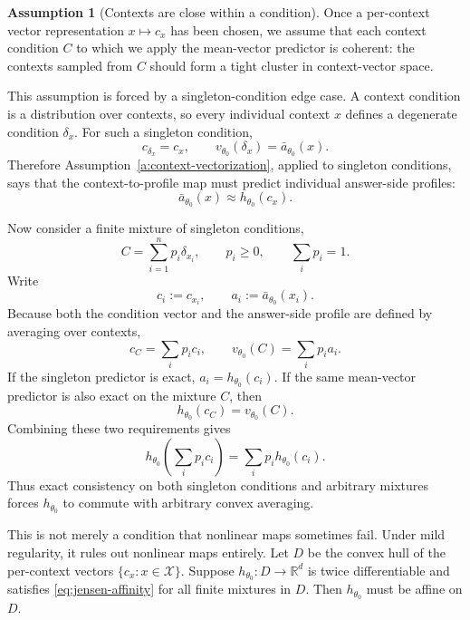 \documentclass[11pt]{article}
\theoremstyle{definition}
\theoremstyle{definition}
\theoremstyle{assumptionstyle}
\newtheorem{assumption}{Assumption}[section]
\begin{document}
\begin{assumption}[Contexts are close within a condition]
\label{a:context-vector-coherence}
Once a per-context vector representation \(x\mapsto c_x\) has been chosen, we
assume that each context condition \(C\) to which we apply the mean-vector
predictor is coherent: the contexts sampled from \(C\) should form a tight
cluster in context-vector space.

This assumption is forced by a singleton-condition edge case. A context condition
is a distribution over contexts, so every individual context \(x\) defines a
degenerate condition \(\delta_x\). For such a singleton condition,
\[
c_{\delta_x}=c_x,
\qquad
v_{\theta_0}(\delta_x)=\bar a_{\theta_0}(x).
\]
Therefore Assumption~\ref{a:context-vectorization}, applied to singleton
conditions, says that the context-to-profile map must predict individual
answer-side profiles:
\[
\bar a_{\theta_0}(x)\approx h_{\theta_0}(c_x).
\]

Now consider a finite mixture of singleton conditions,
\[
C=\sum_{i=1}^n p_i\delta_{x_i},
\qquad
p_i\ge 0,
\qquad
\sum_i p_i=1.
\]
Write
\[
c_i:=c_{x_i},
\qquad
a_i:=\bar a_{\theta_0}(x_i).
\]
Because both the condition vector and the answer-side profile are defined by
averaging over contexts,
\[
c_C=\sum_i p_i c_i,
\qquad
v_{\theta_0}(C)=\sum_i p_i a_i.
\]
If the singleton predictor is exact, \(a_i=h_{\theta_0}(c_i)\). If the same
mean-vector predictor is also exact on the mixture \(C\), then
\[
h_{\theta_0}(c_C)
=
v_{\theta_0}(C).
\]
Combining these two requirements gives
\[
h_{\theta_0}\!\left(\sum_i p_i c_i\right)
=
\sum_i p_i h_{\theta_0}(c_i).
\tag{1}
\label{eq:jensen-affinity}
\]
Thus exact consistency on both singleton conditions and arbitrary mixtures
forces \(h_{\theta_0}\) to commute with arbitrary convex averaging.

This is not merely a condition that nonlinear maps sometimes fail. Under mild
regularity, it rules out nonlinear maps entirely. Let \(D\) be the convex hull of
the per-context vectors \(\{c_x:x\in\mathcal X\}\). Suppose
\(h_{\theta_0}:D\to\mathbb R^d\) is twice differentiable and satisfies
\eqref{eq:jensen-affinity} for all finite mixtures in \(D\). Then
\(h_{\theta_0}\) must be affine on \(D\).


\end{assumption}
\end{document}
